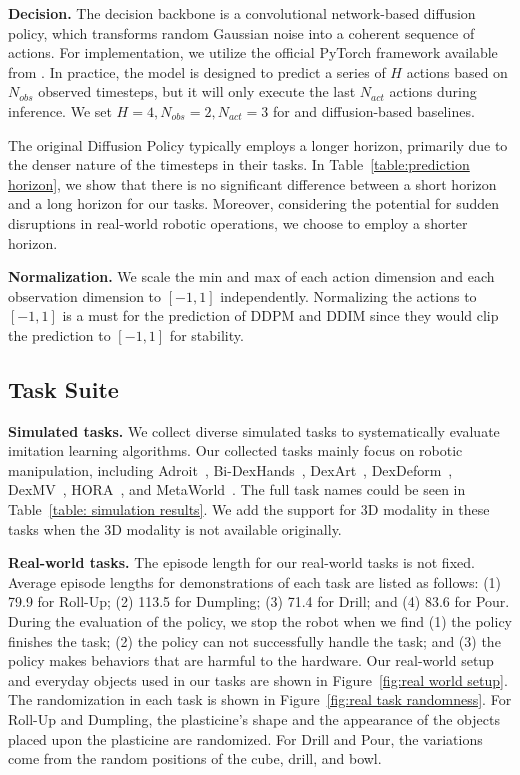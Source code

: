 \begin{appendix}
\noindent\textbf{Decision.} The decision backbone is a convolutional network-based diffusion policy, which transforms random Gaussian noise into a coherent sequence of actions. For implementation, we utilize the official PyTorch framework available from \citep{chi2023diffusion_policy}. In practice, the model is designed to predict a series of $H$ actions based on $N_{obs}$ observed timesteps, but it will only execute the last $N_{act}$ actions during inference. We set $H=4, N_{obs}=2, N_{act}=3$ for \ours and diffusion-based baselines.


The original Diffusion Policy typically employs a longer horizon, primarily due to the denser nature of the timesteps in their tasks.  In Table~\ref{table:prediction horizon}, we show that there is no significant difference between a short horizon and a long horizon for our tasks. Moreover, considering the potential for sudden disruptions in real-world robotic operations, we choose to employ a shorter horizon.

\noindent\textbf{Normalization.} We scale the min and max of each action dimension and each observation dimension to $[-1, 1]$ independently. Normalizing the actions to $[-1,1]$ is a must for the prediction of DDPM and DDIM since they would clip the prediction to $[-1,1]$ for stability. 

\subsection{Task Suite}

\noindent\textbf{Simulated tasks.} We collect diverse simulated tasks to systematically evaluate imitation learning algorithms. Our collected tasks mainly focus on robotic manipulation, including   Adroit~\citep{rajeswaran2017dapg}, Bi-DexHands~\citep{chen2022bidexhands}, DexArt~\citep{bao2023dexart}, DexDeform~\citep{li2023dexdeform}, DexMV~\citep{qin2022dexmv}, HORA~\citep{qi2023hora}, and MetaWorld~\citep{yu2020metaworld}. The full task names could be seen in Table~\ref{table: simulation results}. We add the support for 3D modality in these tasks when the 3D modality is not available originally. 

% 




\noindent\textbf{Real-world tasks.} The episode length for our real-world tasks is not fixed. Average episode lengths for demonstrations of each task are listed as follows: (1) 79.9 for Roll-Up; (2) 113.5 for Dumpling; (3) 71.4 for Drill; and (4) 83.6 for Pour. During the evaluation of the policy, we stop the robot when we find (1) the policy finishes the task; (2) the policy can not successfully handle the task; and (3) the policy makes behaviors that are harmful to the hardware. Our real-world setup and everyday objects used in our tasks are shown in Figure~\ref{fig:real world setup}. The randomization in each task is shown in Figure~\ref{fig:real task randomness}. For Roll-Up and Dumpling, the plasticine's shape and the appearance of the objects placed upon the plasticine are randomized. For Drill and Pour, the variations come from the random positions of the cube, drill, and bowl. 




\end{appendix}
